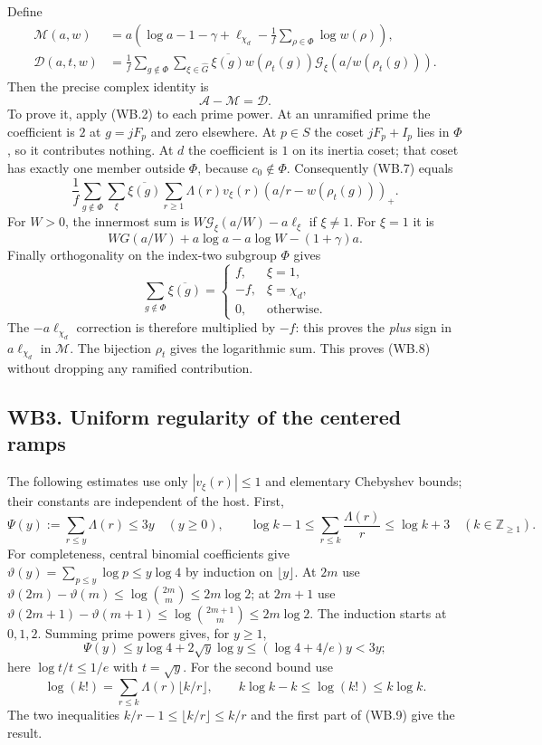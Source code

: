 Define
\begin{align*}
 \mathcal M(a,w)&=a\left(\log a-1-\gamma+\ell_{\chi_d}
                       -\frac1f\sum_{\rho\in\Phi}\log w(\rho)\right),\\
 \mathcal D(a,t,w)&=\frac1f\sum_{g\notin\Phi}
       \sum_{\xi\in\widehat G}\overline{\xi(g)}
       w(\rho_t(g))\mathcal G_\xi(a/w(\rho_t(g))).
\end{align*}
Then the precise complex identity is
\[
                 \boxed{\ \mathcal A-\mathcal M=\mathcal D.\ }
 \tag{WB.8}
\]
To prove it, apply (WB.2) to each prime power. At an unramified prime
the coefficient is $2$ at $g=jF_p$ and zero elsewhere. At $p\in S$
the coset $jF_p+I_p$ lies in $\Phi$, so it contributes nothing.
At $d$ the coefficient is $1$ on its inertia coset; that coset has
exactly one member outside $\Phi$, because $c_0\notin\Phi$.
Consequently (WB.7) equals
\[
 \frac1f\sum_{g\notin\Phi}\sum_\xi\overline{\xi(g)}
       \sum_{r\ge1}\Lambda(r)v_\xi(r)(a/r-w(\rho_t(g)))_+ .
\]
For $W>0$, the innermost sum is $W\mathcal G_\xi(a/W)-a\ell_\xi$
if $\xi\ne1$. For $\xi=1$ it is
\[
 WG(a/W)+a\log a-a\log W-(1+\gamma)a.
\]
Finally orthogonality on the index-two subgroup $\Phi$ gives
\[
 \sum_{g\notin\Phi}\overline{\xi(g)}=
 \begin{cases} f,&\xi=1,\\-f,&\xi=\chi_d,\\0,&\text{otherwise}.
 \end{cases}
\]
The $-a\ell_{\chi_d}$ correction is therefore multiplied by $-f$:
this proves the \emph{plus} sign in $a\ell_{\chi_d}$ in
$\mathcal M$. The bijection $\rho_t$ gives the logarithmic sum.
This proves (WB.8) without dropping any ramified contribution.

\subsection{WB3. Uniform regularity of the centered ramps}

The following estimates use only $|v_\xi(r)|\le1$ and elementary
Chebyshev bounds; their constants are independent of the host.
First,
\[
 \Psi(y):=\sum_{r\le y}\Lambda(r)\le3y\quad(y\ge0),\qquad
 \log k-1\le\sum_{r\le k}\frac{\Lambda(r)}r\le\log k+3
 \quad(k\in\mathbb Z_{\ge1}).
 \tag{WB.9}
\]
For completeness, central binomial coefficients give
$\vartheta(y)=\sum_{p\le y}\log p\le y\log4$ by induction on
$\lfloor y\rfloor$. At $2m$ use
$\vartheta(2m)-\vartheta(m)\le\log\binom{2m}{m}\le2m\log2$;
at $2m+1$ use
$\vartheta(2m+1)-\vartheta(m+1)\le
\log\binom{2m+1}{m}\le2m\log2$.
The induction starts at $0,1,2$.
Summing prime powers gives, for $y\ge1$,
\[
 \Psi(y)\le y\log4+2\sqrt y\log y
 \le(\log4+4/e)y<3y;
\]
here $\log t/t\le1/e$ with $t=\sqrt y$. For the second bound use
\[
 \log(k!)=\sum_{r\le k}\Lambda(r)\lfloor k/r\rfloor,
 \qquad k\log k-k\le\log(k!)\le k\log k.
\]
The two inequalities $k/r-1\le\lfloor k/r\rfloor\le k/r$ and
the first part of (WB.9) give the result.

